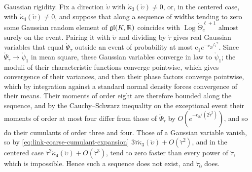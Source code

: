 Gaussian rigidity. Fix a direction \(\mathring\upsilon\) with \(\mathring\kappa_3(\mathring\upsilon)\neq0\), or, in
the centered case, with \(\mathring\kappa_4(\mathring\upsilon)\neq0\), and suppose that along a sequence of
widths tending to zero some Gaussian random element of \(\mathfrak{gl}(K,\mathbb R)\) coincides with
\(\operatorname{Log}\mathring\Theta^{\ell+1}_e\) almost surely on the event. Pairing it with
\(\mathring\upsilon\) and dividing by \(\mathring\tau\) gives real Gaussian variables that equal
\(\mathring\Psi_{\mathring\tau}\) outside an event of probability at most
\(\mathrm c_1e^{-\mathrm c_2/\mathring\tau^2}\). Since \(\mathring\Psi_{\mathring\tau}\to\mathring\psi_1\) in mean
square, these Gaussian variables converge in law to \(\mathring\psi_1\); the moduli of their characteristic
functions converge pointwise, which gives convergence of their variances, and then their phase factors
converge pointwise, which by integration against a standard normal density forces convergence of their
means. Their moments of order eight are therefore bounded along the sequence, and by the Cauchy--Schwarz
inequality on the exceptional event their moments of order at most four differ from those of
\(\mathring\Psi_{\mathring\tau}\) by \(O(e^{-\mathrm c_2/(2\mathring\tau^2)})\), and so do their cumulants of order
three and four. Those of a Gaussian variable vanish, so by \eqref{eq:link-coarse-cumulant-expansion}
\(3\mathring\tau\mathring\kappa_3(\mathring\upsilon)+O(\mathring\tau^2)\), and in the centered case
\(\mathring\tau^2\mathring\kappa_4(\mathring\upsilon)+O(\mathring\tau^3)\), tend to zero faster than every power
of \(\mathring\tau\), which is impossible. Hence such a sequence does not exist, and \(\mathring\tau_0\) does.

